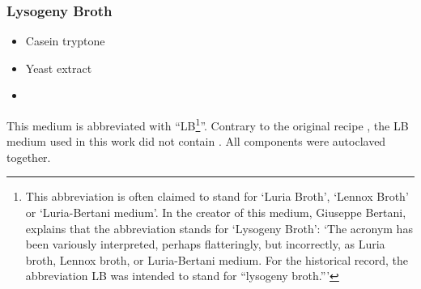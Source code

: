 \subsubsection{Lysogeny Broth}
\begin{itemize}
	\item {} Casein tryptone
	\item {} Yeast extract
	\item {} 
\end{itemize}
This medium is abbreviated with \enquote{LB\footnote{This abbreviation is often claimed to stand for \enquote{Luria Broth}, \enquote{Lennox Broth} or \enquote{Luria-Bertani medium}. In \cite{Bertani2004} the creator of this medium, Giuseppe Bertani, explains that the abbreviation stands for \enquote{Lysogeny Broth}: \enquote{The acronym has been variously interpreted, perhaps flatteringly, but incorrectly, as Luria broth, Lennox broth, or Luria-Bertani medium. For the historical record, the abbreviation LB was intended to stand for \enquote{lysogeny broth.}}}}. Contrary to the original recipe \cite{Bertani2004}, the LB medium used in this work did not contain \glc{}. All components were autoclaved together.

